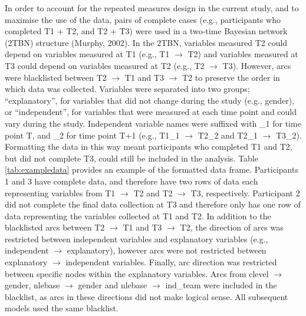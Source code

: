 \documentclass[man,floatsintext]{apa6}
\begin{document}
In order to account for the repeated measures design in the current study, and to maximise the use of the data, pairs of complete cases (e.g., participants who completed T1 + T2, and T2 + T3) were used in a two-time Bayesian network (2TBN) structure (Murphy, 2002).
In the 2TBN, variables measured T2 could depend on variables measured at T1 (e.g., T1 \(\rightarrow\) T2) and variables measured at T3 could depend on variables measured at T2 (e.g., T2 \(\rightarrow\) T3).
However, arcs were blacklisted between T2 \(\rightarrow\) T1 and T3 \(\rightarrow\) T2 to preserve the order in which data was collected.
Variables were separated into two groups; \enquote{explanatory}, for variables that did not change during the study (e.g., gender), or \enquote{independent}, for variables that were measured at each time point and could vary during the study.
Independent variable names were suffixed with \_1 for time point T, and \_2 for time point T+1 (e.g., T1\_1 \(\rightarrow\) T2\_2 and T2\_1 \(\rightarrow\) T3\_2).
Formatting the data in this way meant participants who completed T1 and T2, but did not complete T3, could still be included in the analysis.
Table \ref{tab:exampledata} provides an example of the formatted data frame.
Participants 1 and 3 have complete data, and therefore have two rows of data each representing variables from T1 \(\rightarrow\) T2 and T2 \(\rightarrow\) T3, respectively.
Participant 2 did not complete the final data collection at T3 and therefore only has one row of data representing the variables collected at T1 and T2.
In addition to the blacklisted arcs between T2 \(\rightarrow\) T1 and T3 \(\rightarrow\) T2, the direction of arcs was restricted between independent variables and explanatory variables (e.g., independent \(\rightarrow\) explanatory), however arcs were not restricted between explanatory \(\rightarrow\) independent variables.
Finally, arc direction was restricted between specific nodes within the explanatory variables.
Arcs from clevel \(\rightarrow\) gender, nlebase \(\rightarrow\) gender and nlebase \(\rightarrow\) ind\_team were included in the blacklist, as arcs in these directions did not make logical sense.
All subsequent models used the same blacklist.
\end{document}
